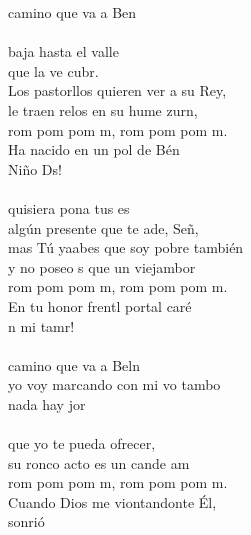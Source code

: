 \begin{cancion}[El tamborilero][]%
	 camino que va a Ben \\
	\jump\\
baja hasta el valle \\
	que la ve cubr. \\
	Los pastorllos quieren ver a su Rey,\\
	le traen relos en su hume zurn,\\
	rom pom pom m, rom pom pom m.\\
	Ha nacido en un pol de Bén\\
	 Niño Ds!\\
	\jump\\
	 quisiera pona tus es\\
	algún presente que te ade, Señ, \\
	mas Tú yaabes que soy pobre también\\
	y no poseo s que un viejambor\\
	rom pom pom m, rom pom pom m.\\
	En tu honor frentl portal caré\\
	n mi tamr!\\
	\jump\\
	 camino que va a Beln\\
	yo voy marcando con mi vo tambo\\
	nada hay jor \\
	\jump\\
que yo te pueda ofrecer,\\
	su ronco acto es un cande am\\
	rom pom pom m, rom pom pom m.\\
	Cuando Dios me viontandonte Él,\\
	 sonrió\\
\end{cancion}%
